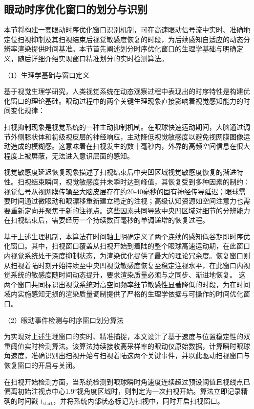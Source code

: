 \label{sec:subsec:event_detection} 
\subsection{眼动时序优化窗口的划分与识别}

本节将构建一套眼动时序优化窗口识别机制，可在高速眼动信号流中实时、准确地定位扫视抑制及其扫视结束后视觉敏感度恢复的时段，为后续感知自适应的动态分辨率渲染提供时间基准。本节首先阐述划分时序优化窗口的生理学基础与明确定义，随后详细介绍实现窗口精准划分的实时检测算法。

（1）生理学基础与窗口定义

基于视觉生理学研究，人类视觉系统在动态观察过程中表现出的时序特性是构建优化窗口的理论基础。眼动过程中的两个关键生理现象直接影响着视觉感知能力的时间变化规律：

扫视抑制现象是视觉系统的一种主动抑制机制。在眼球快速运动期间，大脑通过调节外侧膝状体和初级视皮层的神经响应，主动降低视觉敏感度以避免视网膜图像运动造成的模糊感。这意味着在扫视发生的数十毫秒内，外界的高频空间信息在很大程度上被屏蔽，无法进入意识层面的感知。

视觉敏感度延迟恢复现象描述了扫视结束后中央凹区域视觉敏感度恢复的渐进特性。扫视结束瞬间，视觉敏感度并未瞬时达到峰值，其恢复受到多种因素的制约：视觉信号从视网膜传输至大脑皮层存在约20-40毫秒的固有神经传导延迟；眼球需要时间通过微眼动和眼漂移重新建立稳定的注视；高级认知资源如空间注意力也需要重新定向并聚焦于新的注视点。这些因素共同导致中央凹区域对细节的分辨能力在扫视结束后，需要经历一个持续数百毫秒的单调递增的恢复过程。

基于上述生理机制，本算法在时间轴上明确定义了两个连续的感知低谷期即时序优化窗口。其中，扫视窗口覆盖从扫视开始到着陆的整个眼球高速运动期，在此窗口内视觉系统处于深度抑制状态，为渲染优化提供了最大的理论冗余度。恢复窗口则从扫视着陆时刻开始持续至中央凹视觉敏感度恢复至稳定注视水平，在此窗口内视觉系统的敏感度随时间动态提升，要求渲染质量必须与之同步、渐进地恢复。
这两个窗口共同标识出视觉系统对高空间频率细节敏感性显著降低的时段，为在时间域内实施感知无损的渲染质量调制提供了严格的生理学依据与可操作的时间优化窗口。

（2）眼动事件检测与时序窗口划分算法

为实现对上述生理窗口的实时、精准捕捉，本文设计了基于速度与位置稳定性的双重阈值实时检测算法。该算法持续接收高采样率的眼动仪原始数据，计算瞬时眼球角速度，准确识别出扫视开始与扫视着陆这两个关键事件，并以此驱动扫视窗口与恢复窗口的开启与关闭。

在扫视开始检测方面，当系统检测到眼球瞬时角速度连续超过预设阈值且视线点已偏离初始注视点中心1.9°视角度区域时，则判定为一次扫视开始。算法立即记录精确的时间戳 $t_{\text{start}}$，并将系统内部状态标记为扫视中，同时开启扫视窗口。

